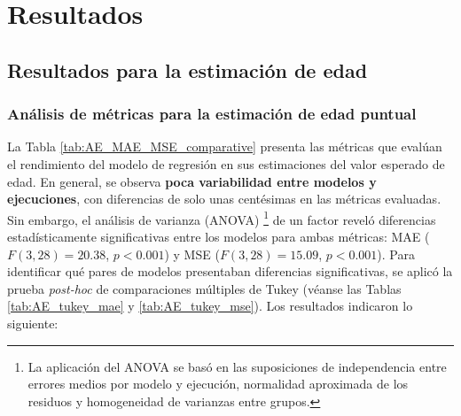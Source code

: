 
\section{Resultados}


\subsection{Resultados para la estimación de edad}

\subsubsection{Análisis de métricas para la estimación de edad puntual}

La Tabla \ref{tab:AE_MAE_MSE_comparative} presenta las métricas que evalúan el rendimiento del modelo de 
regresión en sus estimaciones del valor esperado de edad.
En general, se observa \textbf{poca variabilidad entre modelos y ejecuciones}, con diferencias de solo unas 
centésimas en las métricas evaluadas. Sin embargo, el análisis de varianza (ANOVA)
\footnote{
    La aplicación del ANOVA se basó en las suposiciones de independencia entre errores medios por modelo y 
    ejecución, normalidad aproximada de los residuos y homogeneidad de varianzas entre grupos.
} 
de un factor reveló 
diferencias estadísticamente significativas entre los modelos para ambas métricas: 
MAE ($F(3, 28) = 20.38$, $p < 0.001$) y MSE ($F(3, 28) = 15.09$, $p < 0.001$).
Para identificar qué pares de modelos presentaban diferencias significativas, se aplicó la prueba 
\textit{post-hoc} de comparaciones múltiples de Tukey (véanse las Tablas \ref{tab:AE_tukey_mae} y 
\ref{tab:AE_tukey_mse}). Los resultados indicaron lo siguiente:



